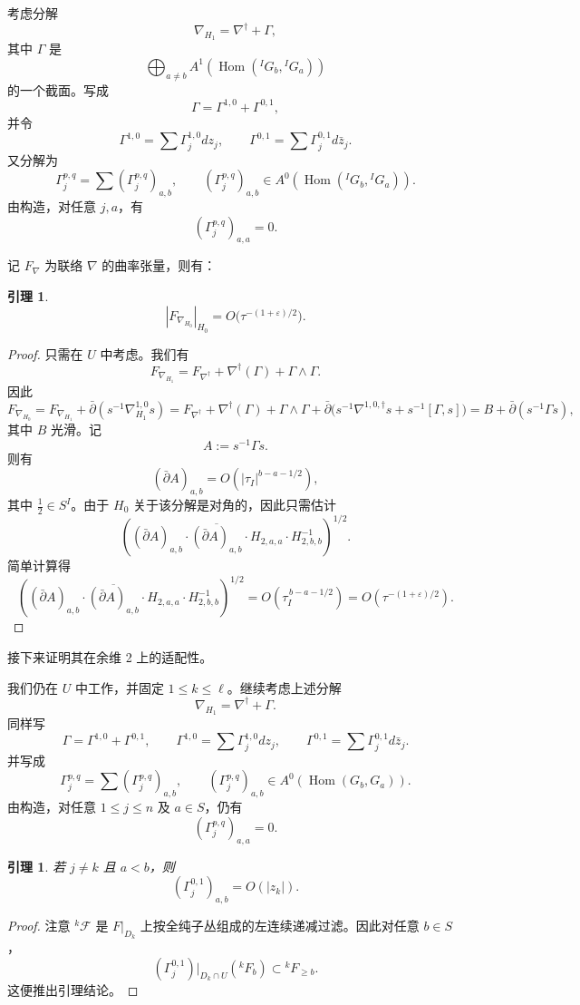 \documentclass[12pt,a4paper]{article}
\newtheorem{lemma}[theorem]{引理}
\newcommand{\Hom}{\operatorname{Hom}}
\begin{document}
考虑分解
\[
\nabla_{H_1}=\nabla^\dagger+\Gamma,
\]
其中 \(\Gamma\) 是
\[
\bigoplus_{a\ne b} A^1(\Hom({}^IG_b,{}^IG_a))
\]
的一个截面。写成
\[
\Gamma=\Gamma^{1,0}+\Gamma^{0,1},
\]
并令
\[
\Gamma^{1,0}=\sum \Gamma_j^{1,0}dz_j,\qquad
\Gamma^{0,1}=\sum \Gamma_j^{0,1}d\bar z_j.
\]
又分解为
\[
\Gamma_j^{p,q}=\sum (\Gamma_j^{p,q})_{a,b},
\qquad
(\Gamma_j^{p,q})_{a,b}\in A^0(\Hom({}^IG_b,{}^IG_a)).
\]
由构造，对任意 \(j,a\)，有
\[
(\Gamma_j^{p,q})_{a,a}=0.
\]

记 \(F_\nabla\) 为联络 \(\nabla\) 的曲率张量，则有：

\begin{lemma}
\[
|F_{\nabla_{H_0}}|_{H_0}=O\bigl(\tau^{-(1+\varepsilon)/2}\bigr).
\]
\end{lemma}

\begin{proof}
只需在 \(U\) 中考虑。我们有
\[
F_{\nabla_{H_1}}
=
F_{\nabla^\dagger}
+\nabla^\dagger(\Gamma)
+\Gamma\wedge \Gamma.
\]
因此
\[
F_{\nabla_{H_0}}
=
F_{\nabla_{H_1}}
+\bar\partial(s^{-1}\nabla^{1,0}_{H_1}s)
=
F_{\nabla^\dagger}
+\nabla^\dagger(\Gamma)
+\Gamma\wedge \Gamma
+\bar\partial\bigl(s^{-1}\nabla^{1,0,\dagger}s+s^{-1}[\Gamma,s]\bigr)
=
B+\bar\partial(s^{-1}\Gamma s),
\]
其中 \(B\) 光滑。记
\[
A:=s^{-1}\Gamma s.
\]
则有
\[
(\bar\partial A)_{a,b}=O(|\tau_I|^{b-a-1/2}),
\]
其中 \(\frac12\in S^I\)。由于 \(H_0\) 关于该分解是对角的，因此只需估计
\[
\left(
(\bar\partial A)_{a,b}\cdot \overline{(\bar\partial A)_{a,b}}\cdot H_{2,a,a}\cdot H_{2,b,b}^{-1}
\right)^{1/2}.
\]
简单计算得
\[
\left(
(\bar\partial A)_{a,b}\cdot \overline{(\bar\partial A)_{a,b}}\cdot H_{2,a,a}\cdot H_{2,b,b}^{-1}
\right)^{1/2}
=
O(\tau_I^{\,b-a-1/2})
=
O(\tau^{-(1+\varepsilon)/2}).
\]
\end{proof}

接下来证明其在余维 2 上的适配性。

我们仍在 \(U\) 中工作，并固定 \(1\le k\le \ell\)。继续考虑上述分解
\[
\nabla_{H_1}=\nabla^\dagger+\Gamma.
\]
同样写
\[
\Gamma=\Gamma^{1,0}+\Gamma^{0,1},
\qquad
\Gamma^{1,0}=\sum \Gamma_j^{1,0}dz_j,\qquad
\Gamma^{0,1}=\sum \Gamma_j^{0,1}d\bar z_j.
\]
并写成
\[
\Gamma_j^{p,q}=\sum (\Gamma_j^{p,q})_{a,b},
\qquad
(\Gamma_j^{p,q})_{a,b}\in A^0(\Hom(G_b,G_a)).
\]
由构造，对任意 \(1\le j\le n\) 及 \(a\in S\)，仍有
\[
(\Gamma_j^{p,q})_{a,a}=0.
\]

\begin{lemma}
若 \(j\ne k\) 且 \(a<b\)，则
\[
(\Gamma_j^{0,1})_{a,b}=O(|z_k|).
\]
\end{lemma}

\begin{proof}
注意 \({}^k\mathcal F\) 是 \(F|_{D_k}\) 上按全纯子丛组成的左连续递减过滤。因此对任意 \(b\in S\)，
\[
(\Gamma_j^{0,1})|_{D_k\cap U}({}^kF_b)\subset {}^kF_{\ge b}.
\]
这便推出引理结论。
\end{proof}
\end{document}
